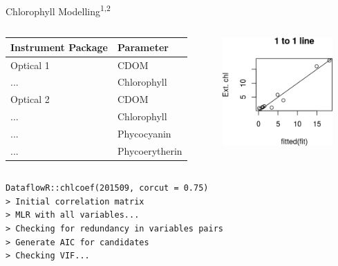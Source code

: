 \documentclass[compress,noflama,nosectionpages]{beamer}
\begin{document}
\begin{frame}{Chlorophyll Modelling\textsuperscript{1,2}}
\vspace{2pt}
	\begin{columns}
		\begin{column}{5cm}
			{\footnotesize
			\begin{tabular}{| l | l |}
				\hline
				Instrument Package & Parameter \\ \hline
				Optical 1 & CDOM \\
				... & Chlorophyll \\ \hline
				Optical 2 & CDOM \\ 
				... & Chlorophyll \\
				... & Phycocyanin \\
				... & Phycoerytherin \\ \hline
			\end{tabular}
			}
			\end{column}
			\begin{column}{4.5cm}
				\includegraphics[width=4.2cm,keepaspectratio=true]{figures/chl_onetoone.png}
			\end{column}
	\end{columns}
	\small
	\texttt{DataflowR::chlcoef(201509, corcut = 0.75)}\\
	\texttt{> Initial correlation matrix}\\
	\texttt{> MLR with all variables...}\\
	\texttt{> Checking for redundancy in variables pairs}\\
	\texttt{> Generate AIC for candidates}\\
	\texttt{> Checking VIF...} 
	
\tiny{}
\end{frame}
\end{document}
